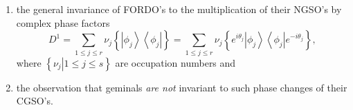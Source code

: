 \documentclass[aps,preprint]{revtex4}%
\begin{document}
\begin{enumerate}
\item the general invariance of FORDO's to the multiplication of their NGSO's
by complex phase factors
\begin{equation}
D^{1}=\sum_{1\leq j\leq r}\nu_{j}\left\{  \left\vert \phi_{j}\right\rangle
\left\langle \phi_{j}\right\vert \right\}  =\sum_{1\leq j\leq r}\nu
_{j}\left\{  e^{i\theta_{j}}\left\vert \phi_{j}\right\rangle \left\langle
\phi_{j}\right\vert e^{-i\theta_{j}}\right\}  ,
\end{equation}
where $\left\{  \left.  \nu_{j}\right\vert 1\leq j\leq s\right\}  $ are
occupation numbers and

\item the observation that geminals \emph{are not }invariant to such phase
changes of their CGSO's.
\end{enumerate}
\end{document}
